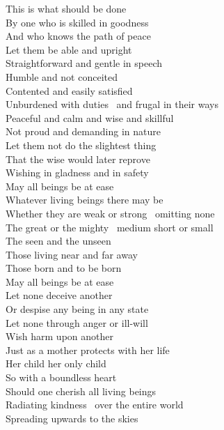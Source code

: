 \begin{english-only}
  This is what should be done\\
  By one who is skilled in goodness\\
  And who knows the path of peace\\
  Let them be able and upright\\
  Straightforward and gentle in speech\\
  Humble and not conceited\\
  Contented and easily satisfied\\
  Unburdened with duties \breathmark\ and frugal in their ways\\
  Peaceful and calm and wise and skillful\\
  Not proud and demanding in nature\\
  Let them not do the slightest thing\\
  That the wise would later reprove\\
  Wishing in gladness and in safety\\
  May all beings be at ease\\
  Whatever living beings there may be\\
  Whether they are weak or strong \breathmark\ omitting none\\
  The great or the mighty \breathmark\ medium short or small\\
  The seen and the unseen\\
  Those living near and far away\\
  Those born and to be born\\
  May all beings be at ease\\
  Let none deceive another\\
  Or despise any being in any state\\
  Let none through anger or ill-will\\
  Wish harm upon another\\
  Just\hyperlink{endnote49-appendix}{\hypertarget{endnote49-body}{}}
  as a mother protects with her life\\
  Her child her only child\\
  So with a boundless heart\\
  Should one cherish all living beings\\
  Radiating kindness \breathmark\ over the entire world\\
  Spreading upwards to the skies\\

\end{english-only}
